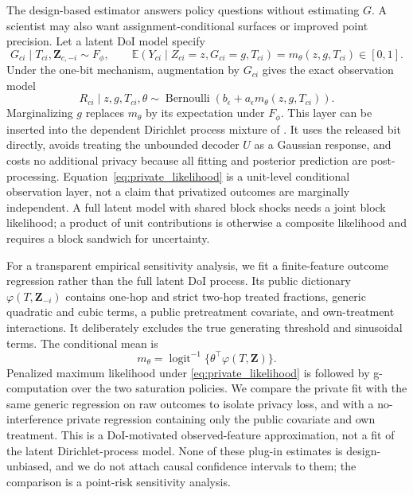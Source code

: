 \documentclass[11pt]{article}
\theoremstyle{definition}
\theoremstyle{remark}
\newcommand{\E}{\mathbb{E}}
\newcommand{\doisig}{a_{\epsilon}}
\DeclareMathOperator{\Bern}{Bernoulli}
\begin{document}
The design-based estimator answers policy questions without estimating $G$. A scientist may
also want assignment-conditional surfaces or improved point precision. Let a latent DoI model
specify
\[
  G_{ci}\mid T_{ci},\mathbf Z_{c,-i}\sim F_{\phi},
  \qquad
  \E(Y_{ci}\mid Z_{ci}=z,G_{ci}=g,T_{ci})=m_{\theta}(z,g,T_{ci})\in[0,1].
\]
Under the one-bit mechanism, augmentation by $G_{ci}$ gives the exact observation model
\begin{equation}
  R_{ci}\mid z,g,T_{ci},\theta
  \sim\Bern\!\left(b_{\epsilon}+\doisig m_{\theta}(z,g,T_{ci})\right).
  \label{eq:private_likelihood}
\end{equation}
Marginalizing $g$ replaces $m_{\theta}$ by its expectation under $F_{\phi}$. This layer can be
inserted into the dependent Dirichlet process mixture of
\citet{OhnishiKarmakarSabbaghi2025}. It uses the released bit directly, avoids treating the
unbounded decoder $U$ as a Gaussian response, and costs no additional privacy because all
fitting and posterior prediction are post-processing. Equation~\eqref{eq:private_likelihood}
is a unit-level conditional observation layer, not a claim that privatized outcomes are
marginally independent. A full latent model with shared block shocks needs a joint block
likelihood; a product of unit contributions is otherwise a composite likelihood and requires a
block sandwich for uncertainty.

For a transparent empirical sensitivity analysis, we fit a finite-feature outcome regression
rather than the full latent DoI process. Its public dictionary
$\varphi(T,\mathbf Z_{-i})$ contains one-hop and strict two-hop treated fractions, generic
quadratic and cubic terms, a public pretreatment covariate, and own-treatment interactions.
It deliberately excludes the true generating threshold and sinusoidal terms. The conditional
mean is
\[
  m_{\theta}=\operatorname{logit}^{-1}\{\theta^\top\varphi(T,\mathbf Z)\}.
\]
Penalized maximum likelihood under \eqref{eq:private_likelihood} is followed by
g-computation over the two saturation policies. We compare the private fit with the same
generic regression on raw outcomes to isolate privacy loss, and with a no-interference private
regression containing only the public covariate and own treatment. This is a DoI-motivated
observed-feature approximation, not a fit of the latent Dirichlet-process model. None of these
plug-in estimates is design-unbiased, and we do not attach causal confidence intervals to
them; the comparison is a point-risk sensitivity analysis.
\end{document}
